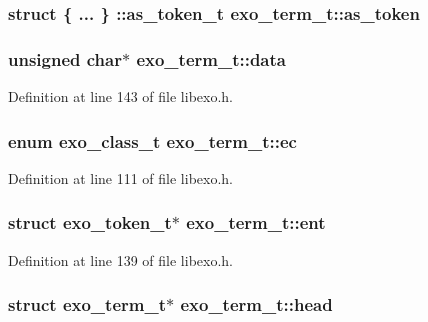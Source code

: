 \subsubsection[{as\_\-token}]{\setlength{\rightskip}{0pt plus 5cm}struct \{ ... \} ::as\_\-token\_\-t  {\bf exo\_\-term\_\-t::as\_\-token}}\label{structexo__term__t_71748f65950622819b28c83d8d3084d3}


\subsubsection[{data}]{\setlength{\rightskip}{0pt plus 5cm}unsigned char$\ast$ {\bf exo\_\-term\_\-t::data}}\label{structexo__term__t_4aa2e76b899e818a7abb01c45d420183}




Definition at line 143 of file libexo.h.
\subsubsection[{ec}]{\setlength{\rightskip}{0pt plus 5cm}enum {\bf exo\_\-class\_\-t} {\bf exo\_\-term\_\-t::ec}}\label{structexo__term__t_0c34b6d816fe43be4d950610290fd266}




Definition at line 111 of file libexo.h.
\subsubsection[{ent}]{\setlength{\rightskip}{0pt plus 5cm}struct {\bf exo\_\-token\_\-t}$\ast$ {\bf exo\_\-term\_\-t::ent}\hspace{0.3cm}{\tt  [read]}}\label{structexo__term__t_17e0fc063a7a4645df4b60ff8b468f38}




Definition at line 139 of file libexo.h.
\subsubsection[{head}]{\setlength{\rightskip}{0pt plus 5cm}struct {\bf exo\_\-term\_\-t}$\ast$ {\bf exo\_\-term\_\-t::head}\hspace{0.3cm}{\tt  [read]}}\label{structexo__term__t_df26c2b4577abe0827751147c60589d9}





